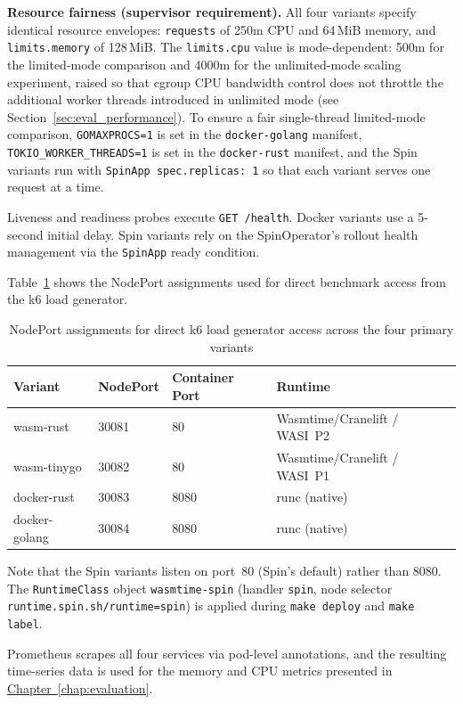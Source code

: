 \begin{sloppypar}
\textbf{Resource fairness (supervisor requirement).} All four variants specify identical resource envelopes: \texttt{requests} of 250m \acs{CPU} and 64\,MiB memory, and \texttt{limits.memory} of 128\,MiB. The \texttt{limits.cpu} value is mode-dependent: 500m for the limited-mode comparison and 4000m for the unlimited-mode scaling experiment, raised so that cgroup CPU bandwidth control does not throttle the additional worker threads introduced in unlimited mode (see Section~\ref{sec:eval_performance}). To ensure a fair single-thread limited-mode comparison, \texttt{GOMAXPROCS=1} is set in the \texttt{docker-golang} manifest, \texttt{TOKIO\_WORKER\_THREADS=1} is set in the \texttt{docker-rust} manifest, and the Spin variants run with \texttt{SpinApp~spec.replicas:~1} so that each variant serves one request at a time.
\end{sloppypar}

\begin{sloppypar}
Liveness and readiness probes execute \texttt{GET /health}. Docker variants use a 5-second initial delay. Spin variants rely on the SpinOperator's rollout health management via the \texttt{SpinApp} ready condition.
\end{sloppypar}

Table~\ref{tab:nodePorts} shows the NodePort assignments used for direct benchmark access from the k6 load generator.

\begin{table}[htbp]
    \centering
    \caption{NodePort assignments for direct k6 load generator access across the four primary variants}
    \label{tab:nodePorts}
    \begin{tabular}{llll}
        \hline
        \textbf{Variant} & \textbf{NodePort} & \textbf{Container Port} & \textbf{Runtime} \\
        \hline
        wasm-rust     & 30081 & 80   & Wasmtime/Cranelift / \acs{WASI}~P2 \\
        wasm-tinygo   & 30082 & 80   & Wasmtime/Cranelift / \acs{WASI}~P1 \\
        docker-rust   & 30083 & 8080 & runc (native) \\
        docker-golang & 30084 & 8080 & runc (native) \\
        \hline
    \end{tabular}
\end{table}

\begin{sloppypar}
Note that the Spin variants listen on port~80 (Spin's default) rather than 8080. The \texttt{RuntimeClass} object \texttt{wasmtime-spin} (handler \texttt{spin}, node selector \texttt{runtime.spin.sh/runtime=spin}) is applied during \texttt{make deploy} and \texttt{make label}.
\end{sloppypar}

Prometheus scrapes all four services via pod-level annotations, and the resulting time-series data is used for the memory and \acs{CPU} metrics presented in \hyperref[chap:evaluation]{Chapter~\ref{chap:evaluation}}.
